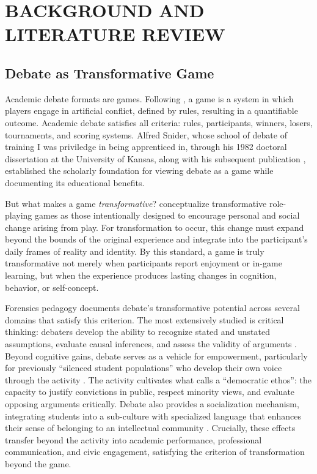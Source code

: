 \section{BACKGROUND AND LITERATURE REVIEW}
\label{sec:background}

\subsection{Debate as Transformative Game}

Academic debate formats are games. Following \textcite{salen2004rules}, a game is a system in which players engage in artificial conflict, defined by rules, resulting in a quantifiable outcome. Academic debate satisfies all criteria: rules, participants, winners, losers, tournaments, and scoring systems. Alfred Snider, whose school of debate of training I was priviledge in being apprenticed in, through his 1982 doctoral dissertation at the University of Kansas, along with his subsequent publication \parencite{snider1984gaming}, established the scholarly foundation for viewing debate as a game while documenting its educational benefits.

But what makes a game \textit{transformative}? \textcite{bowman2025transformative} conceptualize transformative role-playing games as those intentionally designed to encourage personal and social change arising from play. For transformation to occur, this change must expand beyond the bounds of the original experience and integrate into the participant's daily frames of reality and identity. By this standard, a game is truly transformative not merely when participants report enjoyment or in-game learning, but when the experience produces lasting changes in cognition, behavior, or self-concept.

Forensics pedagogy documents debate's transformative potential across several domains that satisfy this criterion. The most extensively studied is critical thinking: debaters develop the ability to recognize stated and unstated assumptions, evaluate causal inferences, and assess the validity of arguments \parencite{colbert1995enhancing, hill1993value}. Beyond cognitive gains, debate serves as a vehicle for empowerment, particularly for previously ``silenced student populations'' who develop their own voice through the activity \parencite{snider2003gamemaster}. The activity cultivates what \textcite{hicks1998public} calls a ``democratic ethos'': the capacity to justify convictions in public, respect minority views, and evaluate opposing arguments critically. Debate also provides a socialization mechanism, integrating students into a sub-culture with specialized language that enhances their sense of belonging to an intellectual community \parencite{cirlin1997sociological, kargacin1998state}. Crucially, these effects transfer beyond the activity into academic performance, professional communication, and civic engagement, satisfying the criterion of transformation beyond the game.

